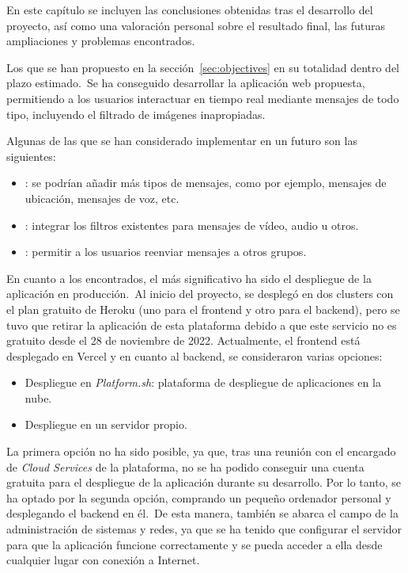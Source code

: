 
En este capítulo se incluyen las conclusiones obtenidas tras el desarrollo del proyecto, así como una valoración
personal sobre el resultado final, las futuras ampliaciones y problemas encontrados.

Los  que se han propuesto en la sección~\ref{sec:objectives}  en su
totalidad dentro del plazo estimado.\ Se ha
conseguido desarrollar la aplicación web propuesta, permitiendo a los usuarios interactuar en tiempo real mediante
mensajes de todo tipo, incluyendo el filtrado de imágenes inapropiadas.

Algunas de las  que se han considerado implementar en un futuro son las siguientes:

\begin{itemize}
	\item {}: se podrían añadir más tipos de mensajes, como por ejemplo, mensajes de
	ubicación, mensajes de voz, etc.
	\item {}: integrar los filtros existentes para mensajes de vídeo, audio
	u otros.
	\item {}: permitir a los usuarios reenviar mensajes a otros grupos.
\end{itemize}

En cuanto a los  encontrados, el más significativo ha sido el despliegue de la aplicación en
producción.\ Al inicio del proyecto, se desplegó en dos clusters con el plan gratuito de Heroku (uno
para el frontend y otro para el backend), pero se tuvo que retirar la aplicación de esta plataforma
debido a que este servicio no es gratuito desde el 28 de noviembre de 2022.
Actualmente, el frontend está desplegado en Vercel y en cuanto al backend, se consideraron varias opciones:

\begin{itemize}
	\item Despliegue en \textit{Platform.sh}: plataforma de despliegue de aplicaciones en la nube.
	\item Despliegue en un servidor propio.
\end{itemize}

La primera opción no ha sido posible, ya que, tras una reunión con el encargado de \textit{Cloud Services} de la
plataforma, no se ha podido conseguir una cuenta gratuita para el despliegue de la aplicación durante su desarrollo.
Por lo tanto, se ha optado por la segunda opción, comprando un pequeño ordenador personal y desplegando el backend en
él.\ De esta manera, también se abarca el campo de la administración de sistemas y redes, ya que se ha tenido que
configurar el servidor para que la aplicación funcione correctamente y se pueda acceder a ella desde cualquier lugar
con conexión a Internet.
